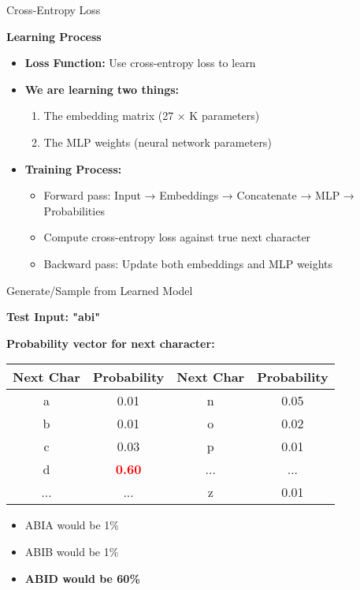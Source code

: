 \documentclass[usenames,dvipsnames]{beamer}
\begin{document}
\begin{frame}{Cross-Entropy Loss}
\begin{center}
\textbf{Learning Process}
\end{center}

\vspace{0.5cm}
\begin{itemize}
\item \textbf{Loss Function:} Use cross-entropy loss to learn
\pause
\item \textbf{We are learning two things:}
  \begin{enumerate}
  \item The embedding matrix (27 × K parameters)
  \item The MLP weights (neural network parameters)
  \end{enumerate}
\pause
\item \textbf{Training Process:}
  \begin{itemize}
  \item Forward pass: Input → Embeddings → Concatenate → MLP → Probabilities
  \item Compute cross-entropy loss against true next character
  \item Backward pass: Update both embeddings and MLP weights
  \end{itemize}
\end{itemize}
\end{frame}

\begin{frame}{Generate/Sample from Learned Model}
\begin{center}
\textbf{Test Input: "abi"}
\end{center}

\vspace{0.5cm}
\begin{center}
\textbf{Probability vector for next character:}
\end{center}

\vspace{0.3cm}
\begin{center}
\begin{tabular}{|c|c||c|c|}
\hline
\textbf{Next Char} & \textbf{Probability} & \textbf{Next Char} & \textbf{Probability} \\
\hline
a & 0.01 & n & 0.05 \\
b & 0.01 & o & 0.02 \\
c & 0.03 & p & 0.01 \\
d & \textcolor{red}{\textbf{0.60}} & ... & ... \\
... & ... & z & 0.01 \\
\hline
\end{tabular}
\end{center}

\vspace{0.5cm}
\begin{itemize}
\item ABIA would be 1\%
\item ABIB would be 1\%  
\item \textbf{ABID would be 60\%}
\end{itemize}
\end{frame}
\end{document}
